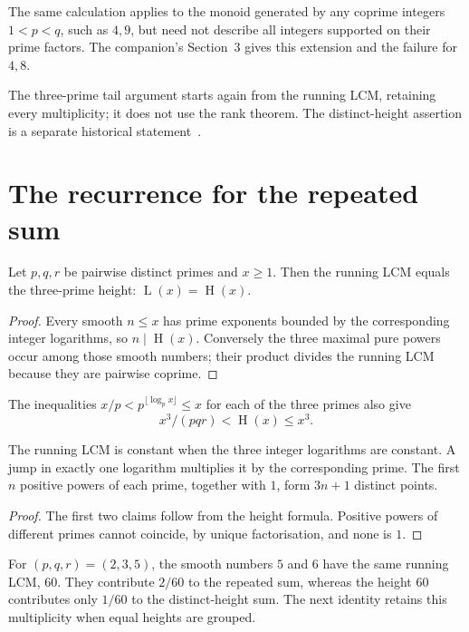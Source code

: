 \documentclass[11pt]{article}
\newcommand{\hgt}{\operatorname{H}}
\newcommand{\Lprefix}{\operatorname{L}}
\begin{document}
The same calculation applies to the monoid generated by any coprime integers
$1<p<q$, such as $4,9$, but need not describe all integers supported on
their prime factors.  The companion's Section~3 gives this extension and
the failure for $4,8$.

The three-prime tail argument starts again from the running LCM, retaining
every multiplicity; it does not use the rank theorem.  The distinct-height
assertion is a separate historical statement~\cite{erdos1974letter}.

\section{The recurrence for the repeated sum}
\label{sec:lcm}\label{sec:cells}\label{sec:fibre}\label{sec:shell}
\label{sec:actual-orbit}

\begin{proposition}\label{res:lcm}
Let $p,q,r$ be pairwise distinct primes and $x\ge1$.  Then the running LCM equals the three-prime height:
$\Lprefix(x)=\hgt(x)$.
\end{proposition}
\begin{proof}
Every smooth $n\le x$ has prime exponents bounded by the corresponding
integer logarithms, so $n\mid\hgt(x)$.  Conversely the three maximal pure
powers occur among those smooth numbers; their product divides the running
LCM because they are pairwise coprime.
\end{proof}

The inequalities $x/p<p^{\lfloor\log_p x\rfloor}\le x$ for each of the
three primes also give
\begin{equation}\label{res:cube}
 x^3/(pqr)<\hgt(x)\le x^3.
\end{equation}

\begin{proposition}\label{res:cell}
The running LCM is constant when the three integer logarithms are constant.
A jump in exactly one logarithm multiplies it by the corresponding prime.
The first $n$ positive powers of each prime, together with $1$, form
$3n+1$ distinct points.
\end{proposition}
\begin{proof}
The first two claims follow from the height formula.  Positive powers of different primes cannot coincide, by unique factorisation, and
none is $1$.
\end{proof}

For $(p,q,r)=(2,3,5)$, the smooth numbers $5$ and $6$ have the same
running LCM, $60$.  They contribute $2/60$ to the repeated sum, whereas
the height $60$ contributes only $1/60$ to the distinct-height sum.
The next identity retains this multiplicity when equal heights are grouped.
\end{document}
